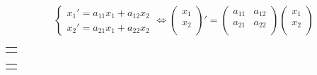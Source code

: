 \begin{equation}
\left\{\begin{array}{rl}
x_1'=a_{11}x_1+a_{12}x_2 \\
x_2'=a_{21}x_1+a_{22}x_2
\end{array}\right.\Leftrightarrow
\begin{pmatrix}
x_1 \\
x_2 \\
\end{pmatrix}
'=
\begin{pmatrix}
a_{11} & a_{12} \\
a_{21} & a_{22} \\
\end{pmatrix}
\begin{pmatrix}
x_1 \\
x_2 \\
\end{pmatrix}
\end{equation}


\newcommand\newtemplate[4][0.4]%
 {\newsavebox#2%
   \savebox#2%
   {\begin{tabular}{@{}c@{}}
      \\[2#1ex]
      \begin{tikzpicture}[scale=#1]
      #4
      \end{tikzpicture}\\[4#1ex]
     \end{tabular}%
   }%
 }
\newcommand\template[1]{\usebox{#1}}             %
\newcommand\templatecaption[1]{{\sffamily\scriptsize#1}}       %
\newcommand\Tr{\mathop{\mathrm{tr}}}

\newtemplate\sink{sink}%
 {\foreach \sx in {+,-}                   %
   {\draw[flow] (\sx4,0) -- (0,0);        %
    \draw[flow] (0,\sx4) -- (0,0);        %
    \foreach \sy in {+,-}                 %
      \foreach \a/\b in {2/1,3/0.44}      %
        \draw[flow,domain=\sx\a:0] plot (\x, {\sy\b*\x*\x});
   }
 }

\newtemplate\source{source}%
 {\foreach \sx in {+,-}                   %
   {\draw[flow] (0,0) -- (\sx4,0);        %
    \draw[flow] (0,0) -- (0,\sx4);        %
    \foreach \sy in {+,-}                 %
      \foreach \a/\b in {2/1,3/0.44}      %
        \draw[flow,domain=0:\sx\a] plot (\x, {\sy\b*\x*\x});
   }
 }

